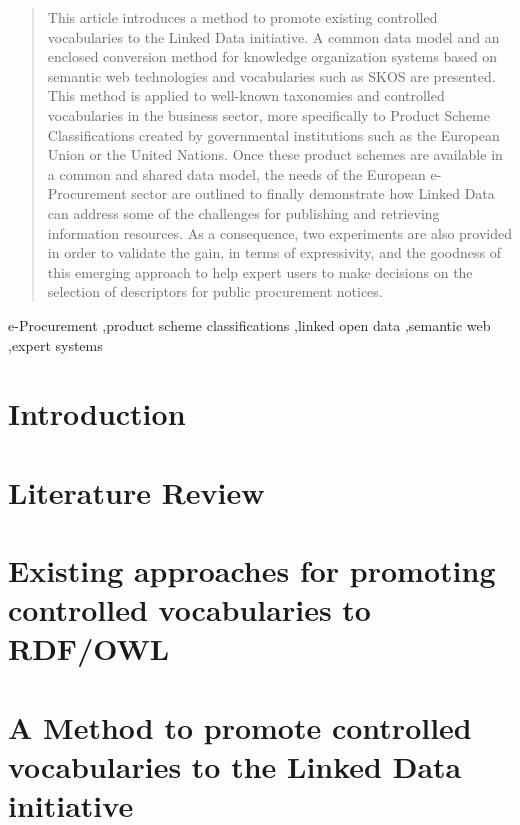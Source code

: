 \documentclass[preprint,12pt]{elsarticle}
\begin{document}
\begin{frontmatter}
\begin{abstract}
This article introduces a method to promote existing controlled vocabularies to 
the Linked Data initiative. A common data model and an enclosed conversion 
method for knowledge organization systems based on semantic web technologies and 
vocabularies such as SKOS are presented.  This method is applied to well-known 
taxonomies and controlled vocabularies in the business sector, more specifically 
to Product Scheme Classifications created by governmental institutions such as 
the European Union or the United Nations. Once these product schemes are 
available in a common and shared data model, the needs of the European 
e-Procurement sector are outlined to finally demonstrate how Linked Data can 
address some of the challenges for publishing and retrieving information 
resources. As a consequence, two experiments are also provided in order to 
validate the gain, in terms of expressivity, and the goodness of this emerging 
approach to help expert users to make decisions on the selection of descriptors 
for public procurement notices.
\end{abstract}

\begin{keyword}
e-Procurement \sep product scheme classifications \sep  linked open data \sep  semantic web \sep expert systems


\end{keyword}


\end{frontmatter}


\section{Introduction}

\section{Literature Review}\label{sect:related-work}

\section{Existing approaches for promoting controlled vocabularies to RDF/OWL}\label{sect:thesauri}

\section{A Method to promote controlled vocabularies to the Linked Data initiative}\label{sect:method}

\end{document}
